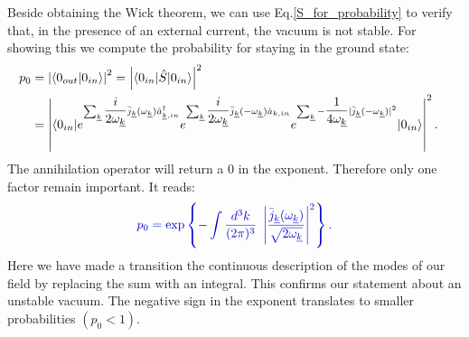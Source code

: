 \documentclass[12pt, titlepage]{article}
\begin{document}
Beside obtaining the Wick theorem,  we can use Eq.\enskip\eqref{S_for_probability} to verify that, in the presence of an external current, the vacuum is not stable. For showing this we compute the probability for staying in the ground state:
\begin{subequations}
\begin{align}
p_{0}&=\left| \braket{0_{out}|0_{in}}\right|^{2}=\left| \braket{0_{in}|\hat{S}|0_{in}}\right|^{2}
	&\\
	&=\left| \braket{0_{in}|e^{    \sum_{\underline{k}}
\dfrac{i}{2\omega_{\underline{k}}}\bar{j}_{\underline{k}}(\omega_{\underline{k}})\hat{a}^{\dagger}_{\underline{k},in}}
e^{    \sum_{\underline{k}}
\dfrac{i}{2\omega_{\underline{k}}}\bar{j}_{\underline{k}}(-\omega_{\underline{k}})\hat{a}_{k,in}}
e^{    \sum_{\underline{k}}
-\dfrac{1}{4\omega_{\underline{k}}}|\bar{j}_{\underline{k}}(-\omega_{\underline{k}})|^{2}}|0_{in}}\right|^{2}
.
\end{align}
\end{subequations}
The annihilation operator will return a $ 0 $ in the exponent. Therefore only one factor remain important. It reads:
\begin{equation}\label{prob_staying}
 \textcolor[RGB]{0,0,204}{
	p_{0}
	= 	\exp\left\lbrace -\int \dfrac{d^{3}k}{(2\pi)^{3}} \ 
 		 			 \left| \dfrac{\bar{j}_{\underline{k}}(\omega_{\underline{k}})}{\sqrt{2\omega_{\underline{k}}}} \right|^{2}
 		 			 \right\rbrace 
 .}
\end{equation}
Here we have made a transition the continuous description of the modes of our field by replacing the sum with an integral. This confirms our statement about an unstable vacuum. The negative sign in the exponent translates to smaller probabilities $ (p_{0}<1) $.

\newpage
\end{document}
